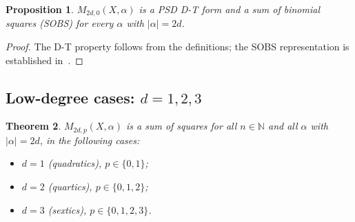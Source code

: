 \documentclass{amsart}
\newtheorem{thm}{Theorem}[section]
\newtheorem{prop}[thm]{Proposition}
\theoremstyle{definition}
\numberwithin{equation}{section}
\newcommand{\naturals}{\mathbb{N}}
\begin{document}
\begin{prop}\label{prop:sobs}
$M_{2d,0}(X,\alpha)$ is a PSD D-T form and a sum of binomial squares (SOBS)
for every $\alpha$ with $|\alpha|=2d$.
\end{prop}

\begin{proof}
The D-T property follows from the definitions; the SOBS representation is
established in~\cite{GM01}.
\end{proof}

\subsection{Low-degree cases: $d=1,2,3$}

\begin{thm}\label{thm:M2dp-sos}
$M_{2d,p}(X,\alpha)$ is a sum of squares for all $n\in\naturals$ and all
$\alpha$ with $|\alpha|=2d$, in the following cases:
\begin{itemize}
  \item $d=1$ (quadratics), $p\in\{0,1\}$;
  \item $d=2$ (quartics), $p\in\{0,1,2\}$;
  \item $d=3$ (sextics), $p\in\{0,1,2,3\}$.
\end{itemize}
\end{thm}
\end{document}
